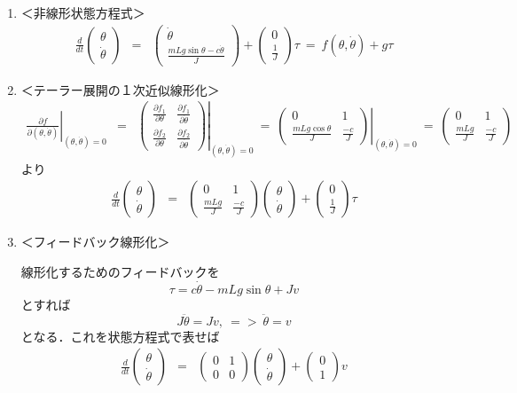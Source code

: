 \documentclass[a4paper,11pt,fleqn]{jreport}
\renewcommand{\bmatrix}{\left(\begin{array}}
\newcommand{\ematrix}{\end{array}\right)}
\begin{document}
\begin{enumerate}
\item 
＜非線形状態方程式＞
\begin{eqnarray*}
	\frac{d}{dt}
	\bmatrix{c}
		\theta \\
		\dot{\theta}
	\ematrix
	& = &
	\bmatrix{c}
		\dot{\theta} \\
		\frac{mLg \sin \theta -c \dot{\theta}}{J}
	\ematrix
	+
	\bmatrix{c}
		0 \\
		\frac{1}{J}
	\ematrix
	\tau 
	\ = \ 
	f(\theta, \dot{\theta}) + g \tau
\end{eqnarray*}
\item
＜テーラー展開の１次近似線形化＞
\begin{eqnarray*}
	\left .
	\frac{\partial f}{\partial (\theta, \dot{\theta})}
	\right \vert _{(\theta,\dot{\theta})=0} 
	& = & 
	\left .
	\bmatrix{cc}
		\frac{\partial f_1}{\partial \theta} &
		  \frac{\partial f_1}{\partial \dot{\theta}} \\
		\frac{\partial f_2}{\partial \theta} &
		  \frac{\partial f_2}{\partial \dot{\theta}}
	\ematrix
	\right \vert_{(\theta,\dot{\theta})=0} 
	\ = \ 
	\left .
	\bmatrix{cc}
		0 & 1 \\
		\frac{mLg \cos \theta}{J} &
		  \frac{-c}{J}
	\ematrix
	\right \vert_{(\theta,\dot{\theta})=0} 
	\ = \ 
	\bmatrix{cc}
		0 & 1 \\
		\frac{mLg}{J} &
		  \frac{-c}{J}
	\ematrix
\end{eqnarray*}
より
\begin{eqnarray*}
	\frac{d}{dt}
	\bmatrix{c}
		\theta \\
		\dot{\theta}
	\ematrix
	& = &
	\bmatrix{cc}
		0 & 1 \\
		\frac{mLg}{J} &
		  \frac{-c}{J}
	\ematrix
	\bmatrix{c}
		\theta \\
		\dot{\theta}
	\ematrix
	+
	\bmatrix{c}
		0 \\
		\frac{1}{J}
	\ematrix
	\tau
\end{eqnarray*}
\item
＜フィードバック線形化＞

線形化するためのフィードバックを
\[
	\tau = c \dot{\theta} - mLg \sin \theta + J v
\]
とすれば
\[
	J \ddot{\theta} = Jv, \ => \ \ddot{\theta}=v
\]
となる．これを状態方程式で表せば
\begin{eqnarray*}
	\frac{d}{dt}
	\bmatrix{c}
		\theta \\
		\dot{\theta}
	\ematrix
	& = &
	\bmatrix{cc}
		0 & 1 \\
		0 & 0
	\ematrix
	\bmatrix{c}
		\theta \\
		\dot{\theta}
	\ematrix
	+
	\bmatrix{c}
		0 \\
		1
	\ematrix
	v
\end{eqnarray*}

\end{enumerate}
\end{document}
